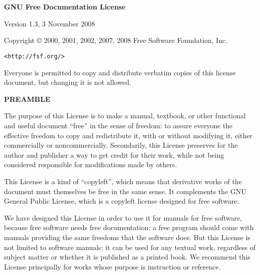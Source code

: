 \chapter{}

\begin{scriptsize}
  \begin{multicols}{2}
    \begin{center}

      {\bf\large GNU Free Documentation License}
   
      Version 1.3, 3 November 2008

      \noindent Copyright \copyright{} 2000, 2001, 2002, 2007, 2008  Free Software Foundation, Inc.
  
      \texttt{<http://fsf.org/>}
  
      \bigskip
 
      Everyone is permitted to copy and distribute verbatim copies of this license document, but changing it is not allowed.
    \end{center}


    \begin{center}
      {\bf PREAMBLE}
    \end{center}

    The purpose of this License is to make a manual, textbook, or other functional and useful document ``free'' in the sense of freedom: to assure everyone the effective freedom to copy and redistribute it, with or without modifying it, either commercially or noncommercially.
    Secondarily, this License preserves for the author and publisher a way to get credit for their work, while not being considered responsible for modifications made by others.

    This License is a kind of ``copyleft'', which means that derivative works of the document must themselves be free in the same sense. It complements the GNU General Public License, which is a copyleft license designed for free software.

    We have designed this License in order to use it for manuals for free software, because free software needs free documentation: a free program should come with manuals providing the same freedoms that the software does. But this License is not limited to software manuals; it can be used for any textual work, regardless of subject matter or whether it is published as a printed book. We recommend this License principally for works whose purpose is instruction or reference.
    

\end{multicols}
\end{scriptsize}
